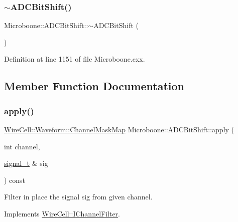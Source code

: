 \subsubsection{\texorpdfstring{$\sim$\+A\+D\+C\+Bit\+Shift()}{~ADCBitShift()}}
{\footnotesize\ttfamily Microboone\+::\+A\+D\+C\+Bit\+Shift\+::$\sim$\+A\+D\+C\+Bit\+Shift (\begin{DoxyParamCaption}{ }\end{DoxyParamCaption})\hspace{0.3cm}{\ttfamily [virtual]}}



Definition at line 1151 of file Microboone.\+cxx.



\subsection{Member Function Documentation}
\mbox{\label{class_wire_cell_1_1_sig_proc_1_1_microboone_1_1_a_d_c_bit_shift_a78c5feeb9f0ab8a04af03d75a8c83046}} 
\subsubsection{\texorpdfstring{apply()}{apply()}\hspace{0.1cm}{\footnotesize\ttfamily [1/2]}}
{\footnotesize\ttfamily \hyperlink{namespace_wire_cell_1_1_waveform_a18b9ae61c858e340252ba3ac83ac3bc0}{Wire\+Cell\+::\+Waveform\+::\+Channel\+Mask\+Map} Microboone\+::\+A\+D\+C\+Bit\+Shift\+::apply (\begin{DoxyParamCaption}\item[{int}]{channel,  }\item[{\hyperlink{class_wire_cell_1_1_i_channel_filter_a434ed96cc4b805fa0eeec14f9f8d85e9}{signal\+\_\+t} \&}]{sig }\end{DoxyParamCaption}) const\hspace{0.3cm}{\ttfamily [virtual]}}

Filter in place the signal {\ttfamily sig} from given {\ttfamily channel}. 

Implements \hyperlink{class_wire_cell_1_1_i_channel_filter_a6981186ee38a4b9b66e16c0d9b376b08}{Wire\+Cell\+::\+I\+Channel\+Filter}.



